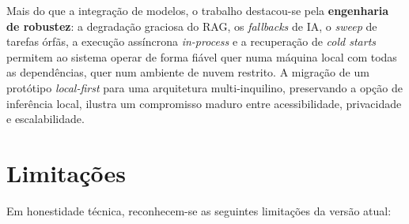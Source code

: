 Mais do que a integração de modelos, o trabalho destacou-se pela
\textbf{engenharia de robustez}: a degradação graciosa do RAG, os
\emph{fallbacks} de IA, o \emph{sweep} de tarefas órfãs, a execução
assíncrona \emph{in-process} e a recuperação de \emph{cold starts}
permitem ao sistema operar de forma fiável quer numa máquina local com
todas as dependências, quer num ambiente de nuvem restrito. A migração de
um protótipo \emph{local-first} para uma arquitetura multi-inquilino,
preservando a opção de inferência local, ilustra um compromisso maduro
entre acessibilidade, privacidade e escalabilidade.

\section{Limitações}
\label{sec:limitacoes}

Em honestidade técnica, reconhecem-se as seguintes limitações da versão
atual:

